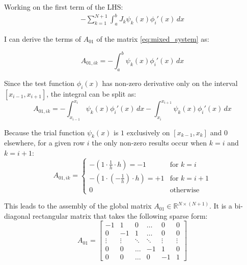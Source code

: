 \documentclass{article}
\begin{document}
Working on the first term of the LHS: 
\begin{align*}
    - \sum_{k=1}^{N+1} \int_a^b J_k \psi_k(x) \phi_i'(x) \, dx
\end{align*}

I can derive the terms of $A_{01}$ of the matrix \eqref{eq:mixed_system} as:

\begin{equation}
    A_{01, ik} = - \int_a^b \psi_k(x) \phi_i'(x) \, dx
\end{equation}

Since the test function $\phi_i(x)$ has non-zero derivative only on the interval $[x_{i-1}, x_{i+1}]$, the integral can be split as:
\begin{equation}
    A_{01, ik} = - \int_{x_{i-1}}^{x_{i}} \psi_k(x) \phi_i'(x) \, dx - \int_{x_{i}}^{x_{i+1}} \psi_k(x) \phi_i'(x) \, dx 
\end{equation}

Because the trial function $\psi_k(x)$ is $1$ exclusively on $[x_{k-1}, x_k]$ and $0$ elsewhere, for a given row $i$ the only non-zero results occur when $k=i$ and $k=i+1$:
\begin{equation}
    A_{01, ik} = 
    \begin{cases}
         - \left( 1 \cdot \frac{1}{h} \cdot h \right) = -1 & \text{for } k = i \\[1ex]
         - \left( 1 \cdot \left(-\frac{1}{h}\right) \cdot h \right) = +1 & \text{for } k = i + 1 \\[1ex]
         0 & \text{otherwise}
    \end{cases}
\end{equation}

This leads to the assembly of the global matrix $A_{01} \in \mathbb{R}^{N \times (N+1)}$. It is a bi-diagonal rectangular matrix that takes the following sparse form:
\begin{equation} \label{eq:matrix_A01}
    A_{01} = 
    \begin{bmatrix}
        -1 &  1 &  0 & \dots &  0 &  0 \\
         0 & -1 &  1 & \dots &  0 &  0 \\
    \vdots & \vdots & \ddots & \ddots & \vdots & \vdots \\
         0 &  0 & \dots & -1 &  1 &  0 \\
         0 &  0 & \dots &  0 & -1 &  1
    \end{bmatrix}
\end{equation}
\end{document}
